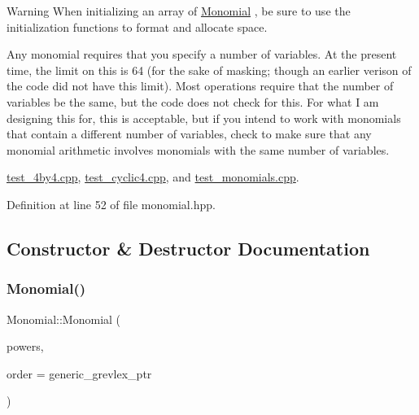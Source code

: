 \begin{DoxyWarning}{Warning}
When initializing an array of {\ttfamily \hyperlink{class_monomial}{Monomial}} , be sure to use the initialization functions to format and allocate space.

Any monomial requires that you specify a number of variables. At the present time, the limit on this is 64 (for the sake of masking; though an earlier verison of the code did not have this limit). Most operations require that the number of variables be the same, but the code does not check for this. For what I am designing this for, this is acceptable, but if you intend to work with monomials that contain a different number of variables, check to make sure that any monomial arithmetic involves monomials with the same number of variables. 
\end{DoxyWarning}
\begin{Desc}
\item[Examples\+: ]\par
\hyperlink{test_4by4_8cpp-example}{test\+\_\+4by4.\+cpp}, \hyperlink{test_cyclic4_8cpp-example}{test\+\_\+cyclic4.\+cpp}, and \hyperlink{test_monomials_8cpp-example}{test\+\_\+monomials.\+cpp}.\end{Desc}


Definition at line 52 of file monomial.\+hpp.



\subsection{Constructor \& Destructor Documentation}
\mbox{\label{class_monomial_a6a46bc011c988af6c400a30bfd82dcba}} 
\subsubsection{\texorpdfstring{Monomial()}{Monomial()}\hspace{0.1cm}{\footnotesize\ttfamily [1/2]}}
{\footnotesize\ttfamily Monomial\+::\+Monomial (\begin{DoxyParamCaption}\item[{initializer\+\_\+list$<$ E\+X\+P\+\_\+\+T\+Y\+PE $>$}]{powers,  }\item[{\hyperlink{class_monomial___ordering}{Monomial\+\_\+\+Ordering} $\ast$}]{order = {\ttfamily generic\+\_\+grevlex\+\_\+ptr} }\end{DoxyParamCaption})}



